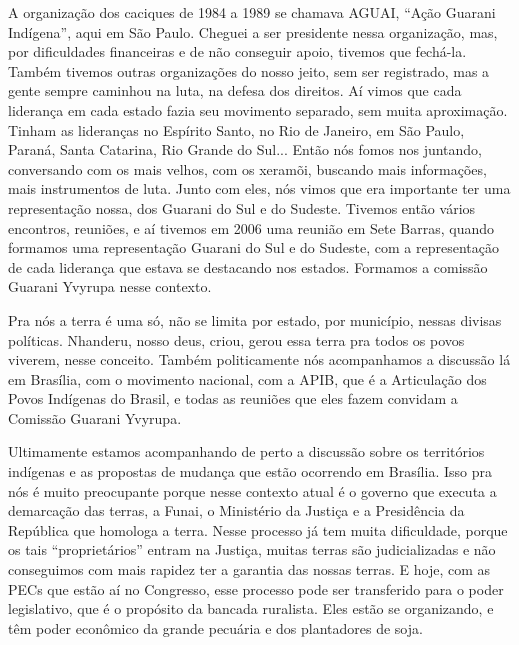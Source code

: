\documentclass{article}
\begin{document}
A organiza\c{c}\~ao dos caciques de 1984 a 1989 se chamava AGUAI,
{\textquotedblleft}A\c{c}\~ao Guarani Ind\'igena{\textquotedblright},
aqui em S\~ao Paulo. Cheguei a ser presidente nessa organiza\c{c}\~ao,
mas, por dificuldades financeiras e de n\~ao conseguir apoio, tivemos
que fech\'a-la. Tamb\'em tivemos outras organiza\c{c}\~oes do nosso
jeito, sem ser registrado, mas a gente sempre caminhou na luta, na
defesa dos direitos. A\'i vimos que cada lideran\c{c}a em cada estado
fazia seu movimento separado, sem muita aproxima\c{c}\~ao. Tinham as
lideran\c{c}as no Esp\'irito Santo, no Rio de Janeiro, em S\~ao Paulo,
Paran\'a, Santa Catarina, Rio Grande do Sul... Ent\~ao n\'os fomos nos
juntando, conversando com os mais velhos, com os xeram\~oi, buscando
mais informa\c{c}\~oes, mais instrumentos de luta. Junto com eles,
n\'os vimos que era importante ter uma representa\c{c}\~ao nossa, dos
Guarani do Sul e do Sudeste. Tivemos ent\~ao v\'arios encontros,
reuni\~oes, e a\'i tivemos em 2006 uma reuni\~ao em Sete Barras, quando
formamos uma representa\c{c}\~ao Guarani do Sul e do Sudeste, com a
representa\c{c}\~ao de cada lideran\c{c}a que estava se destacando nos
estados. Formamos a comiss\~ao Guarani Yvyrupa nesse contexto. 

Pra n\'os a terra \'e uma s\'o, n\~ao se limita por estado, por
munic\'ipio, nessas divisas pol\'iticas. Nhanderu, nosso deus, criou,
gerou essa terra pra todos os povos viverem, nesse conceito. Tamb\'em
politicamente n\'os acompanhamos a discuss\~ao l\'a em Bras\'ilia, com
o movimento nacional, com a APIB, que \'e a Articula\c{c}\~ao dos Povos
Ind\'igenas do Brasil, e todas as reuni\~oes que eles fazem convidam a
Comiss\~ao Guarani Yvyrupa.

Ultimamente estamos acompanhando de perto a discuss\~ao sobre os
territ\'orios ind\'igenas e as propostas de mudan\c{c}a que est\~ao
ocorrendo em Bras\'ilia. Isso pra n\'os \'e muito preocupante porque
nesse contexto atual \'e o governo que executa a demarca\c{c}\~ao das
terras, a Funai, o Minist\'erio da Justi\c{c}a e a Presid\^encia da
Rep\'ublica que homologa a terra. Nesse processo j\'a tem muita
dificuldade, porque os tais
{\textquotedblleft}propriet\'arios{\textquotedblright} entram na
Justi\c{c}a, muitas terras s\~ao judicializadas e n\~ao conseguimos com
mais rapidez ter a garantia das nossas terras. E hoje, com as PECs que
est\~ao a\'i no Congresso, esse processo pode ser transferido para o
poder legislativo, que \'e o prop\'osito da bancada ruralista. Eles
est\~ao se organizando, e t\^em poder econ\^omico da grande pecu\'aria
e dos plantadores de soja. 
\end{document}
